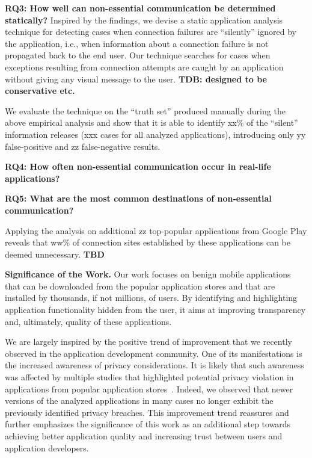 \vspace{0.1in}
\noindent 
{\bf RQ3: How well can non-essential communication be determined statically?}
Inspired by the findings, we devise a static application analysis technique for detecting cases when connection failures are
``silently''  ignored by the application, i.e., when information about a connection failure is not propagated back to the end user.
Our technique searches for cases when exceptions resulting from connection attempts are caught by an application without giving any visual message to the user. 
{\bf TDB: designed to be conservative etc.}

We evaluate the technique on the ``truth set'' produced manually during the above empirical analysis and show that it is able to identify xx\% of the ``silent'' information releases (xxx cases for all analyzed applications), introducing only yy false-positive and zz false-negative results. 


\vspace{0.1in}
\noindent 
{\bf RQ4: How often non-essential communication occur in real-life applications?}

\noindent 
{\bf RQ5: What are the most common destinations of non-essential communication?}



Applying the analysis on additional zz top-popular applications from Google Play reveals that ww\% of connection sites established by these applications can be deemed unnecessary.
{\bf TBD}


\vspace{0.1in}
\noindent 
{\bf Significance of the Work.}
Our work focuses on benign  mobile applications that can be downloaded from the popular application stores and that are installed by thousands, if not millions, of users.
By identifying and highlighting application functionality hidden from the user, it aims at improving transparency and, ultimately, quality of these applications. 
 
We are largely inspired by the positive trend of improvement that we recently observed in the application development community.
One of its manifestations is the increased awareness of privacy considerations. It is likely that such awareness was affected by multiple studies that highlighted
potential privacy violation in applications from popular application stores~\cite{Enck:Gilbert:Chun:Cox:Jung:McDaniel:Sheth:OSDI10, Egele:Kruegel:Kirda:Vign:NDSS11,Tripp:Rubin:SEC14}.
Indeed, we observed that newer versions of the analyzed applications in many cases no longer exhibit the previously identified privacy breaches.  
This improvement trend reassures and further emphasizes the significance of this work as an additional step towards achieving better application quality and increasing trust between users and application developers. 

